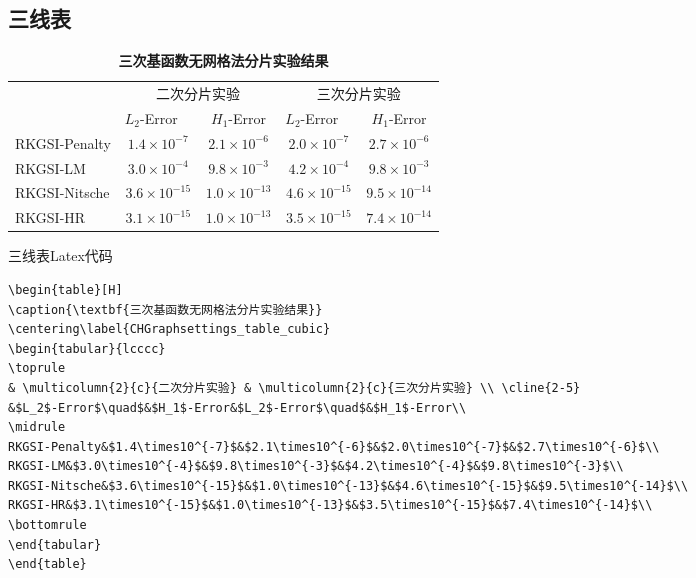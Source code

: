 \documentclass[internationalmaster]{hquThesis}
\begin{document}
\subsection*{三线表}
\begin{table}[H]
    \caption{\textbf{三次基函数无网格法分片实验结果}}
    \centering\label{CHGraphsettings_table_cubic}
    \begin{tabular}{lcccc}
       \toprule
    & \multicolumn{2}{c}{二次分片实验} & \multicolumn{2}{c}{三次分片实验} \\ \cline{2-5}
       &$L_2$-Error$\quad$&$H_1$-Error&$L_2$-Error$\quad$&$H_1$-Error\\
       \midrule
      RKGSI-Penalty&$1.4\times10^{-7}$&$2.1\times10^{-6}$&$2.0\times10^{-7}$&$2.7\times10^{-6}$\\
      RKGSI-LM&$3.0\times10^{-4}$&$9.8\times10^{-3}$&$4.2\times10^{-4}$&$9.8\times10^{-3}$\\
      RKGSI-Nitsche&$3.6\times10^{-15}$&$1.0\times10^{-13}$&$4.6\times10^{-15}$&$9.5\times10^{-14}$\\
      RKGSI-HR&$3.1\times10^{-15}$&$1.0\times10^{-13}$&$3.5\times10^{-15}$&$7.4\times10^{-14}$\\
       \bottomrule
    \end{tabular}
    \end{table}
三线表Latex代码
\begin{lstlisting}
\begin{table}[H]
\caption{\textbf{三次基函数无网格法分片实验结果}}
\centering\label{CHGraphsettings_table_cubic}
\begin{tabular}{lcccc}
\toprule
& \multicolumn{2}{c}{二次分片实验} & \multicolumn{2}{c}{三次分片实验} \\ \cline{2-5}
&$L_2$-Error$\quad$&$H_1$-Error&$L_2$-Error$\quad$&$H_1$-Error\\
\midrule
RKGSI-Penalty&$1.4\times10^{-7}$&$2.1\times10^{-6}$&$2.0\times10^{-7}$&$2.7\times10^{-6}$\\
RKGSI-LM&$3.0\times10^{-4}$&$9.8\times10^{-3}$&$4.2\times10^{-4}$&$9.8\times10^{-3}$\\
RKGSI-Nitsche&$3.6\times10^{-15}$&$1.0\times10^{-13}$&$4.6\times10^{-15}$&$9.5\times10^{-14}$\\
RKGSI-HR&$3.1\times10^{-15}$&$1.0\times10^{-13}$&$3.5\times10^{-15}$&$7.4\times10^{-14}$\\
\bottomrule
\end{tabular}
\end{table}    
\end{lstlisting}
\end{document}
